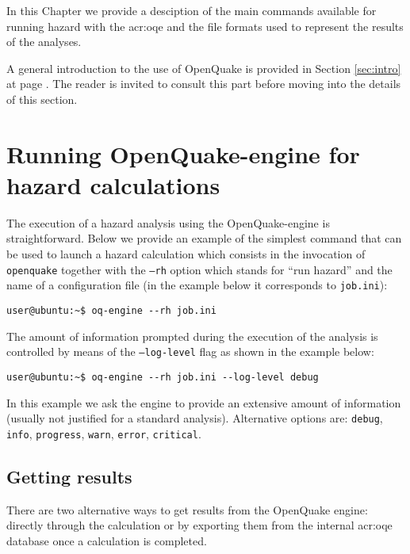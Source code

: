 In this Chapter we provide a desciption of the main commands available
for running hazard with the \gls{acr:oqe} and the file formats used to 
represent the results of the analyses.

A general introduction to the use of OpenQuake is provided in Section 
\ref{sec:intro} at page \pageref{sec:intro}.
The reader is invited to consult this part before moving into
the details of this section.
\section{Running OpenQuake-engine for hazard calculations}
The execution of a hazard analysis using the OpenQuake-engine 
is straightforward. Below we provide an example of the simplest 
command that can be used to launch a hazard calculation which 
consists in the invocation of \texttt{openquake} together with 
the \texttt{--rh} option which stands for ``run hazard'' and 
the name of a configuration file (in the example below
it corresponds to \texttt{job.ini}):
\begin{Verbatim}[frame=single, commandchars=\\\{\}, fontsize=\small]
user@ubuntu:~$ oq-engine --rh job.ini
\end{Verbatim}

The amount of information prompted during the execution of the 
analysis is controlled by means of the \texttt{--log-level} flag 
as shown in the example below:
\begin{Verbatim}[frame=single, commandchars=\\\{\}, fontsize=\small]
user@ubuntu:~$ oq-engine --rh job.ini --log-level debug
\end{Verbatim}
In this example we ask the engine to provide an extensive amount
of information (usually not justified for a standard analysis). 
Alternative options are: \texttt{debug}, \texttt{info}, \texttt{progress},
\texttt{warn}, \texttt{error}, \texttt{critical}.
\subsection{Getting results}
\label{sec:getting_results}
There are two alternative ways to get results from the OpenQuake engine:
directly through the calculation or by exporting them from the 
internal \gls{acr:oqe} database once a calculation is completed. 

